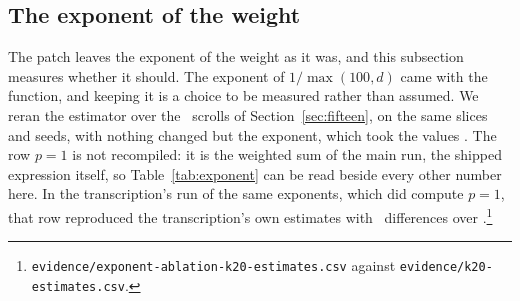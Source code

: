 \subsection{The exponent of the weight}
\label{sec:exponent}

The patch leaves the exponent of the weight as it was, and this subsection measures whether it
should. The exponent of $1/\max(100,d)$ came with the function, and keeping it is a choice to be
measured rather than assumed. We reran the estimator over the \RevExpScrolls\ scrolls of
Section~\ref{sec:fifteen}, on the same slices and seeds, with nothing changed but the exponent,
which took the values \RevExpList. The row $p=1$ is not recompiled: it is the weighted sum of the
main run, the shipped expression itself, so Table~\ref{tab:exponent} can be read beside every other
number here. In the transcription's run of the same exponents, which did compute $p=1$, that row
reproduced the transcription's own estimates with \RevExpReproDiffs\ differences over
\RevExpReproEstimates.\footnote{\texttt{evidence/exponent-ablation-k20-estimates.csv} against
\texttt{evidence/k20-estimates.csv}.}

